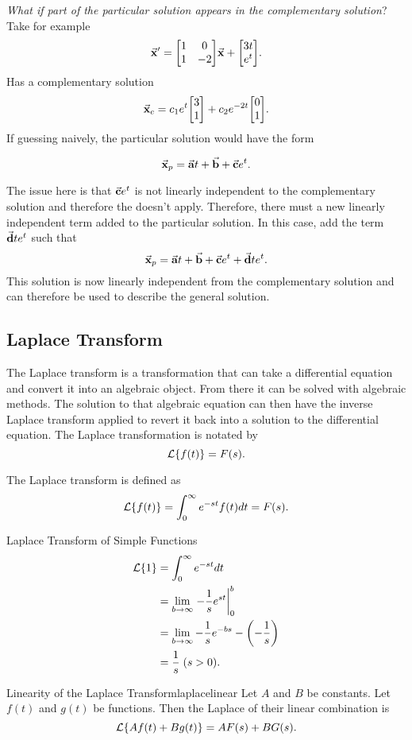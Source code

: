 \documentclass[../notes.tex]{subfiles}
\begin{document}
\textit{What if part of the particular solution appears in the complementary solution}? Take for example
\[
    \va{x}' = \mqty[1 & 0 \\ 1 & -2]\va{x} + \mqty[3t \\ e^{t}]
.\] 
Has a complementary solution
\[
    \va{x}_c = c_1 e^{t} \mqty[3 \\ 1] + c_2 e^{-2t} \mqty[0 \\ 1]
.\]
If guessing naively, the particular solution would have the form

\[
\va{x}_p = \va{a}t + \va{b} + \va{c}e^{t}
.\] 

The issue here is that $\va{c} e^{t}$ is not linearly independent to the complementary solution and therefore the  doesn't apply. Therefore, there must a new linearly independent term added to the particular solution. In this case, add the term $\va{d} t e^{t}$ such that
\[
    \va{x}_p = \va{a}t + \va{b} + \va{c}e^{t} + \va{d} t e^{t}
.\] 
This solution is now linearly independent from the complementary solution and can therefore be used to describe the general solution.

\subsection{Laplace Transform}

The Laplace transform is a transformation that can take a differential equation and convert it into an algebraic object. From there it can be solved with algebraic methods. The solution to that algebraic equation can then have the inverse Laplace transform applied to revert it back into a solution to the differential equation. The Laplace transformation is notated by
\[
    \mathcal{L}\qty{ f(t) } = F(s)
.\] 

The Laplace transform is defined as
\[
    \mathcal{L}\qty{ f(t) } = \int_{0}^{\infty} e^{-st} f(t) dt = F(s)
.\]

\begin{stickynote}{Laplace Transform of Simple Functions}
\begin{align*}
    \laplace{1} &= \int_{0}^{\infty} e^{-st} dt \\
                &= \lim_{b \to \infty} \eval{-\frac{1}{s} e^{st}}_0^{b} \\
                &= \lim_{b \to \infty} -\frac{1}{s} e^{-bs} - \qty(-\frac{1}{s}) \\
                &= \frac{1}{s} \; (s > 0)
.\end{align*}    
\end{stickynote}

\begin{theorem}{Linearity of the Laplace Transform}{laplacelinear}
    Let $A$ and  $B$ be constants. Let  $f(t)$ and  $g(t)$ be functions. Then the Laplace of their linear combination is
     \[
         \mathcal{L}\qty{ Af(t) + Bg(t) } = A F(s) + B G(s)
    .\] 
\end{theorem}
\end{document}
